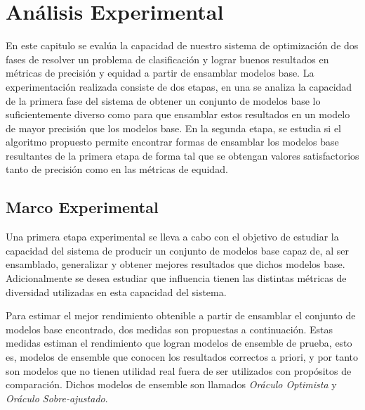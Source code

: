 \chapter{Análisis Experimental}\label{chapter:experiments}

En este capitulo se evalúa la capacidad de nuestro sistema de optimización de dos fases de resolver un problema de clasificación y lograr buenos resultados en métricas de precisión y equidad a partir de ensamblar modelos base.
La experimentación realizada consiste de dos etapas, en una se analiza la capacidad de la primera fase del sistema de obtener un conjunto de modelos base lo suficientemente diverso como para que ensamblar estos resultados en un modelo de mayor precisión que los modelos base.
En la segunda etapa, se estudia si el algoritmo propuesto permite encontrar formas de ensamblar los modelos base resultantes de la primera etapa de forma tal que se obtengan valores satisfactorios tanto de precisión como en las métricas de equidad.

\section{Marco Experimental}

Una primera etapa experimental se lleva a cabo con el objetivo de estudiar la capacidad del sistema de producir un conjunto de modelos base capaz de, al ser ensamblado, generalizar y obtener mejores resultados que dichos modelos base.
Adicionalmente se desea estudiar que influencia tienen las distintas métricas de diversidad utilizadas en esta capacidad del sistema.

Para estimar el mejor rendimiento obtenible a partir de ensamblar el conjunto de modelos base encontrado, dos medidas son propuestas a continuación.
Estas medidas estiman el rendimiento que logran modelos de ensemble de prueba, esto es, modelos de ensemble que conocen los resultados correctos a priori, y por tanto son modelos que no tienen utilidad real fuera de ser utilizados con propósitos de comparación.
Dichos modelos de ensemble son llamados \emph{Oráculo Optimista} y \emph{Oráculo Sobre-ajustado}.

